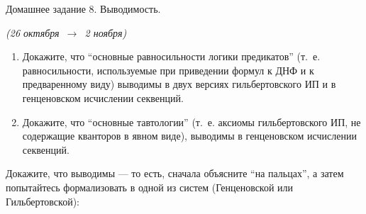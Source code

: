 \documentclass[a4paper,11pt]{article}
\begin{document}
\begin{center}
	{\Large Домашнее задание 8. Выводимость.}

	{\it (26 октября\ \(\to\)\ 2 ноября)}
\end{center}

\begin{enumerate}
	\item Докажите, что “основные равносильности логики предикатов” (т.~е. равносильности, используемые при приведении формул к ДНФ и к предваренному виду) выводимы в двух версиях гильбертовского ИП и в генценовском исчислении секвенций.

	\item Докажите, что “основные тавтологии” (т.~е. аксиомы гильбертовского ИП, не содержащие кванторов в явном виде), выводимы в генценовском исчислении секвенций. 
\end{enumerate}

Докажите, что выводимы — то есть, сначала объясните “на пальцах”, а затем попытайтесь формализовать в одной из систем (Генценовской или Гильбертовской):
\end{document}
